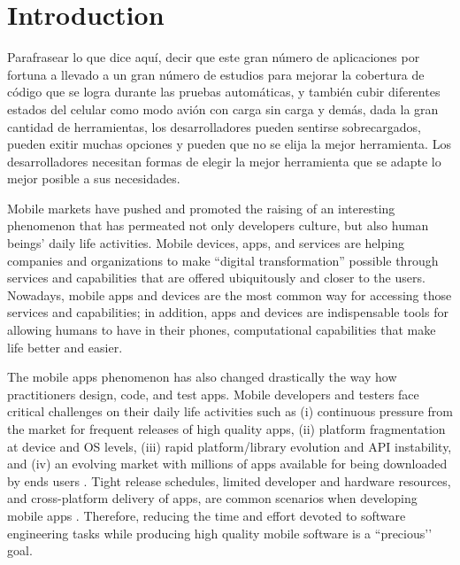 
\chapter{Introduction} %

\label{Chapter1} %
 
Parafrasear lo que dice aquí, decir que este gran número de aplicaciones por fortuna a llevado a un gran número de estudios para mejorar la cobertura de código que se logra durante las pruebas automáticas, y también cubir diferentes estados del celular como modo avión con carga sin carga y demás, dada la gran cantidad de herramientas, los desarrolladores pueden sentirse sobrecargados, pueden exitir muchas opciones y pueden que no se elija la mejor herramienta. 
Los desarrolladores necesitan formas de elegir la mejor herramienta que se adapte lo mejor posible a sus necesidades.
 
Mobile markets have pushed and promoted the raising of an interesting phenomenon that has permeated not only developers culture, but also human beings’ daily life activities. Mobile devices, apps, and services are helping companies and organizations to make “digital transformation” possible through services and capabilities that are offered ubiquitously and closer to the users. Nowadays, mobile apps and devices are the most common way for accessing those services and capabilities; in addition, apps and devices are indispensable tools for allowing humans to have in their phones, computational capabilities that make life better and easier.

The mobile apps phenomenon has also changed drastically the way how practitioners design, code, and test apps.  Mobile developers and testers face critical challenges on their daily life activities such as (i) continuous pressure from the market for frequent releases of high quality apps, (ii) platform fragmentation at device and OS levels, (iii) rapid platform/library evolution and API instability, and (iv) an evolving market with millions of apps available for being downloaded by ends users \cite{joorabchi2013real,palomba2018crowdsourcing}. Tight release schedules, limited developer and hardware resources, and cross-platform delivery of apps, are common scenarios when developing mobile apps \cite{joorabchi2013real}. Therefore, reducing the time and effort devoted to software engineering tasks while producing high quality mobile software is a ``precious’’ goal.

